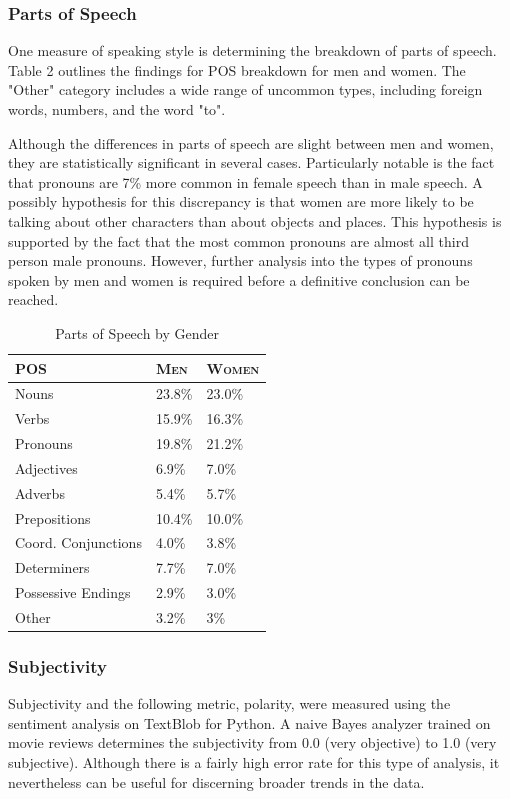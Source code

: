 \documentclass[12pt]{article} %
\begin{document}
\subsubsection{Parts of Speech}
One measure of speaking style is determining the breakdown of parts of speech. Table 2 outlines the findings for POS breakdown for men and women. The "Other" category includes a wide range of uncommon types, including foreign words, numbers, and the word "to".

Although the differences in parts of speech are slight between men and women, they are statistically significant in several cases. Particularly notable is the fact that pronouns are 7\% more common in female speech than in male speech. A possibly hypothesis for this discrepancy is that women are more likely to be talking about other characters than about objects and places. This hypothesis is supported by the fact that the most common pronouns are almost all third person male pronouns. However, further analysis into the types of pronouns spoken by men and women is required before a definitive conclusion can be reached.

\begin{center}
\begin{table}
\centering

\begin{tabular}{|l|l|l|}
  \hline
 \textsc{POS} & \textsc{Men} & \textsc{Women}\\
  \hline
  Nouns & 23.8\% & 23.0\% \\
  Verbs & 15.9\% & 16.3\% \\
  Pronouns & 19.8\% & 21.2\% \\
  Adjectives & 6.9\% & 7.0\% \\
  Adverbs & 5.4\% & 5.7\% \\
  Prepositions & 10.4\% & 10.0\% \\
  Coord. Conjunctions & 4.0\% & 3.8\% \\
  Determiners & 7.7\% & 7.0\% \\
  Possessive Endings & 2.9\% & 3.0\% \\
  Other & 3.2\% & 3\%\\
  \hline
\end{tabular}
	\caption{Parts of Speech by Gender}
\end{table}
\end{center}

\subsubsection{Subjectivity}
Subjectivity and the following metric, polarity, were measured using the sentiment analysis on TextBlob for Python. A naive Bayes analyzer trained on movie reviews determines the subjectivity from 0.0 (very objective) to 1.0 (very subjective). Although there is a fairly high error rate for this type of analysis, it nevertheless can be useful for discerning broader trends in the data.
\end{document}
